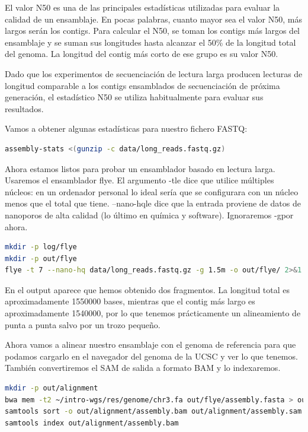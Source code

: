 \begin{itemize}
El valor N50 es una de las principales estadísticas utilizadas para evaluar la calidad de un ensamblaje. En pocas palabras, cuanto mayor sea el valor N50, más largos serán los contigs.
Para calcular el N50, se toman los contigs más largos del ensamblaje y se suman sus longitudes hasta alcanzar el 50\% de la longitud total del genoma. La longitud del contig más corto de ese grupo es su valor N50.

Dado que los experimentos de secuenciación de lectura larga producen lecturas de longitud comparable a los contigs ensamblados de secuenciación de próxima generación, el estadístico N50 se utiliza habitualmente para evaluar sus resultados.

Vamos a obtener algunas estadísticas para nuestro fichero FASTQ:
\begin{lstlisting}[language=bash]
assembly-stats <(gunzip -c data/long_reads.fastq.gz)
\end{lstlisting}

Ahora estamos listos para probar un ensamblador basado en lectura larga.
Usaremos el ensamblador flye. El argumento -tle dice que utilice múltiples núcleos: en un ordenador personal lo ideal sería que se configurara con un núcleo menos que el total que tiene. --nano-hqle dice que la entrada proviene de datos de nanoporos de alta calidad (lo último en química y software). Ignoraremos -gpor ahora.
\begin{lstlisting}[language=bash]
mkdir -p log/flye
mkdir -p out/flye
flye -t 7 --nano-hq data/long_reads.fastq.gz -g 1.5m -o out/flye/ 2>&1 | tee log/flye/assembly.log
\end{lstlisting}
En el output aparece que hemos obtenido dos fragmentos. La longitud total es aproximadamente 1550000 bases, mientras que el contig más largo es aproximadamente 1540000, por lo que tenemos prácticamente un alineamiento de punta a punta salvo por un trozo pequeño. 

Ahora vamos a alinear nuestro ensamblaje con el genoma de referencia para que podamos cargarlo en el navegador del genoma de la UCSC y ver lo que tenemos. También convertiremos el SAM de salida a formato BAM y lo indexaremos.
\begin{lstlisting}[language=bash]
mkdir -p out/alignment
bwa mem -t2 ~/intro-wgs/res/genome/chr3.fa out/flye/assembly.fasta > out/alignment/assembly.sam
samtools sort -o out/alignment/assembly.bam out/alignment/assembly.sam
samtools index out/alignment/assembly.bam
\end{lstlisting}


\end{itemize}
